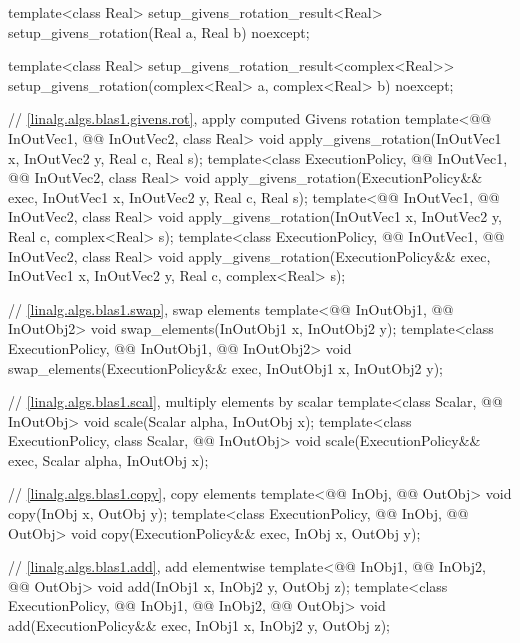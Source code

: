 \begin{codeblock}
{  template<class Real>
    setup_givens_rotation_result<Real> setup_givens_rotation(Real a, Real b) noexcept;

  template<class Real>
    setup_givens_rotation_result<complex<Real>>
      setup_givens_rotation(complex<Real> a, complex<Real> b) noexcept;

  // \ref{linalg.algs.blas1.givens.rot}, apply computed Givens rotation
  template<@@ InOutVec1, @@ InOutVec2, class Real>
    void apply_givens_rotation(InOutVec1 x, InOutVec2 y, Real c, Real s);
  template<class ExecutionPolicy, @@ InOutVec1, @@ InOutVec2, class Real>
    void apply_givens_rotation(ExecutionPolicy&& exec,
                               InOutVec1 x, InOutVec2 y, Real c, Real s);
  template<@@ InOutVec1, @@ InOutVec2, class Real>
    void apply_givens_rotation(InOutVec1 x, InOutVec2 y, Real c, complex<Real> s);
  template<class ExecutionPolicy, @@ InOutVec1, @@ InOutVec2, class Real>
    void apply_givens_rotation(ExecutionPolicy&& exec,
                               InOutVec1 x, InOutVec2 y, Real c, complex<Real> s);

  // \ref{linalg.algs.blas1.swap}, swap elements
  template<@@ InOutObj1, @@ InOutObj2>
    void swap_elements(InOutObj1 x, InOutObj2 y);
  template<class ExecutionPolicy, @@ InOutObj1, @@ InOutObj2>
    void swap_elements(ExecutionPolicy&& exec,
                       InOutObj1 x, InOutObj2 y);

  // \ref{linalg.algs.blas1.scal}, multiply elements by scalar
  template<class Scalar, @@ InOutObj>
    void scale(Scalar alpha, InOutObj x);
  template<class ExecutionPolicy, class Scalar, @@ InOutObj>
    void scale(ExecutionPolicy&& exec,
               Scalar alpha, InOutObj x);

  // \ref{linalg.algs.blas1.copy}, copy elements
  template<@@ InObj, @@ OutObj>
    void copy(InObj x, OutObj y);
  template<class ExecutionPolicy, @@ InObj, @@ OutObj>
    void copy(ExecutionPolicy&& exec,
              InObj x, OutObj y);

  // \ref{linalg.algs.blas1.add}, add elementwise
  template<@@ InObj1, @@ InObj2, @@ OutObj>
    void add(InObj1 x, InObj2 y, OutObj z);
  template<class ExecutionPolicy, @@ InObj1, @@ InObj2, @@ OutObj>
    void add(ExecutionPolicy&& exec,
             InObj1 x, InObj2 y, OutObj z);

}
\end{codeblock}
